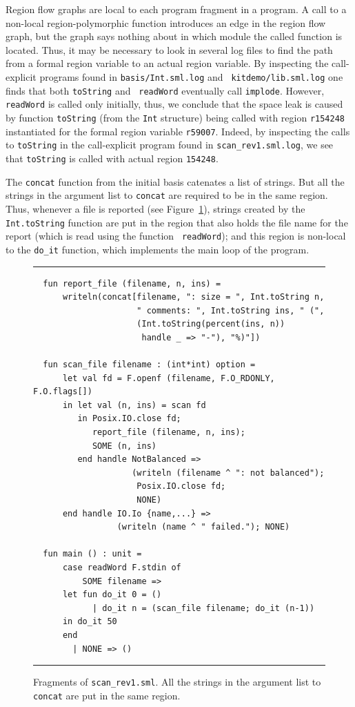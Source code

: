 \documentclass[12pt]{book}
\begin{document}
Region flow graphs are local to each program fragment in a program. A
call to a non-local region-polymorphic function introduces an edge in
the region flow graph, but the graph says nothing about in which
module the called function is located. Thus, it may be necessary to
look in several log files to find the path from a formal region
variable to an actual region variable. By inspecting the call-explicit
programs found in {\tt basis/Int.sml.log} and {\tt
  kitdemo/lib.sml.log} one finds that both {\tt toString} and {\tt
  readWord} eventually call {\tt implode}. However, {\tt readWord} is
called only initially, thus, we conclude that the space leak is caused
by function {\tt toString} (from the {\tt Int} structure) being called
with region {\tt r154248} instantiated for the formal region variable
{\tt r59007}. Indeed, by inspecting the calls to {\tt toString} in the
call-explicit program found in {\tt scan\_rev1.sml.log}, we see that
{\tt toString} is called with actual region {\tt 154248}.

The {\tt concat} function from the initial basis catenates a list of
strings. But all the strings in the argument list to {\tt concat} are
required to be in the same region. Thus, whenever a file is reported
(see Figure~\ref{report_file.fig}), strings created by the {\tt
  Int.toString} function are put in the region that also holds the
file name for the report (which is read using the function {\tt
  readWord}); and this region is non-local to the {\tt do\_it}
function, which implements the main loop of the program.
\begin{figure}
\hrule \medskip
\begin{verbatim}
  fun report_file (filename, n, ins) =
      writeln(concat[filename, ": size = ", Int.toString n,
                     " comments: ", Int.toString ins, " (",
                     (Int.toString(percent(ins, n))
                      handle _ => "-"), "%)"])

  fun scan_file filename : (int*int) option =
      let val fd = F.openf (filename, F.O_RDONLY, F.O.flags[])
      in let val (n, ins) = scan fd
         in Posix.IO.close fd;
            report_file (filename, n, ins);
            SOME (n, ins)
         end handle NotBalanced =>
                    (writeln (filename ^ ": not balanced");
                     Posix.IO.close fd;
                     NONE)
      end handle IO.Io {name,...} =>
                 (writeln (name ^ " failed."); NONE)

  fun main () : unit =
      case readWord F.stdin of
          SOME filename =>
	  let fun do_it 0 = ()
	        | do_it n = (scan_file filename; do_it (n-1))
	  in do_it 50
	  end
        | NONE => ()
\end{verbatim}
\caption{Fragments of {\tt scan\_rev1.sml}. All the strings in the
  argument list to {\tt concat} are put in the same region.}
\label{report_file.fig}
\medskip \hrule
\end{figure}
\end{document}

